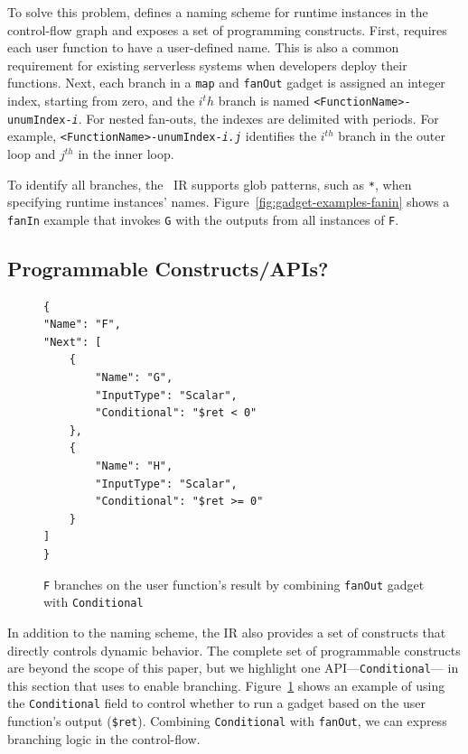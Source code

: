 To solve this problem, \name{} defines a naming scheme for runtime instances
in the control-flow graph and exposes a set of programming constructs. First,
\name{} requires each user function to have a user-defined name. This is also
a common requirement for existing serverless systems when developers deploy
their functions. Next, each branch in a \texttt{map} and \texttt{fanOut}
gadget is assigned an integer index, starting from zero, and the $i^th$ branch
is named \texttt{<FunctionName>-unumIndex-\emph{i}}. For nested fan-outs, the
indexes are delimited with periods. For example,
\texttt{<FunctionName>-unumIndex-\emph{i.j}} identifies the $i^{th}$ branch in
the outer loop and $j^{th}$ in the inner loop.

To identify all branches, the \name{}~IR supports glob patterns, such as
\texttt{*}, when specifying runtime instances' names.
Figure~\ref{fig:gadget-examples-fanin} shows a \texttt{fanIn} example that
invokes \texttt{G} with the outputs from all instances of \texttt{F}.

\subsection{Programmable Constructs/APIs?}

\begin{figure}[]
    \begin{verbatim}
{
"Name": "F",
"Next": [
    {
        "Name": "G",
        "InputType": "Scalar",
        "Conditional": "$ret < 0"
    },
    {
        "Name": "H",
        "InputType": "Scalar",
        "Conditional": "$ret >= 0"
    }
]
}
    \end{verbatim}
    \caption{\texttt{F} branches on the user function's result by
    combining \texttt{fanOut} gadget with \texttt{Conditional}}
    \label{fig:gadget-examples-branch}
\end{figure}

In addition to the naming scheme, the IR also provides a set of constructs
that directly controls dynamic behavior. The complete set of programmable
constructs are beyond the scope of this paper, but we highlight one
API---\texttt{Conditional}--- in this section that \name{} uses to enable
branching. Figure~\ref{fig:gadget-examples-branch} shows an example of using
the \texttt{Conditional} field to control whether to run a gadget based on the
user function's output (\texttt{\$ret}). Combining \texttt{Conditional} with
\texttt{fanOut}, we can express branching logic in the control-flow. 

